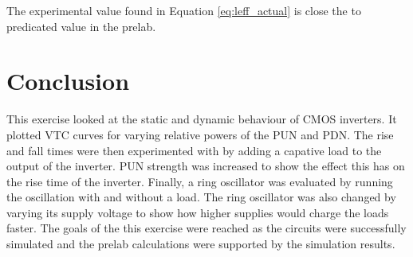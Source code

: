 \documentclass[CMPE]{../KGCOEReport}
\begin{document}
	The experimental value found in Equation \ref{eq:leff_actual} is close the
	to predicated value in the prelab. 

	\section*{Conclusion}
	This exercise looked at the static and dynamic behaviour of CMOS inverters. It
	plotted VTC curves for varying relative powers of the PUN and PDN. The rise and
	fall times were then experimented with by adding a capative load to the output of
	the inverter. PUN strength was increased to show the effect this has on the rise time
	of the inverter. Finally, a ring oscillator was evaluated by running the oscillation
	with and without a load. The ring oscillator was also changed by varying its supply
	voltage to show how higher supplies would charge the loads faster. The goals of
	the this exercise were reached as the circuits were successfully simulated and the
	prelab calculations were supported by the simulation results.
\end{document}
